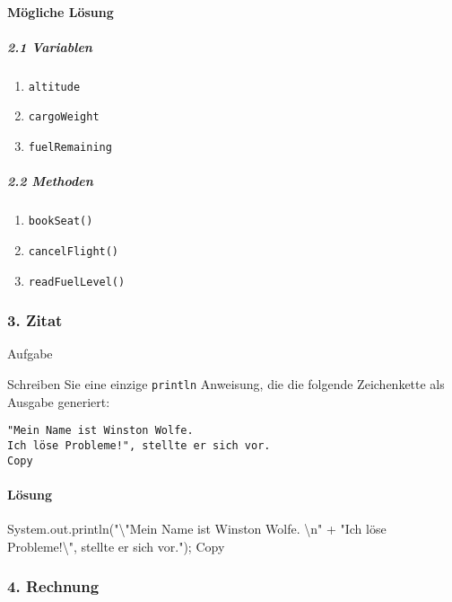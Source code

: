 \documentclass[
]{article}
\newenvironment{Shaded}{}{}
\newcommand{\NormalTok}[1]{#1}
\providecommand{\tightlist}{%
  \setlength{\itemsep}{0pt}\setlength{\parskip}{0pt}}
\begin{document}
\paragraph{Mögliche Lösung}\label{muxf6gliche-luxf6sung}

\subparagraph{2.1 Variablen}\label{variablen}

\begin{enumerate}
\tightlist
\item
  \texttt{altitude}
\item
  \texttt{cargoWeight}
\item
  \texttt{fuelRemaining}
\end{enumerate}

\subparagraph{2.2 Methoden}\label{methoden}

\begin{enumerate}
\tightlist
\item
  \texttt{bookSeat()}
\item
  \texttt{cancelFlight()}
\item
  \texttt{readFuelLevel()}
\end{enumerate}

\subsubsection{3. Zitat}\label{zitat}

Aufgabe

Schreiben Sie eine einzige \texttt{println} Anweisung, die die folgende
Zeichenkette als Ausgabe generiert:

\begin{verbatim}
"Mein Name ist Winston Wolfe.  
Ich löse Probleme!", stellte er sich vor.
Copy
\end{verbatim}

\paragraph{Lösung}\label{luxf6sung-1}

\begin{Shaded}
\begin{Highlighting}[]
\NormalTok{System.out.println("\textbackslash{}"Mein Name ist Winston Wolfe. \textbackslash{}n" +}
\NormalTok{    "Ich löse Probleme!\textbackslash{}", stellte er sich vor.");}
\NormalTok{Copy}
\end{Highlighting}
\end{Shaded}

\subsubsection{4. Rechnung}\label{rechnung}
\end{document}
